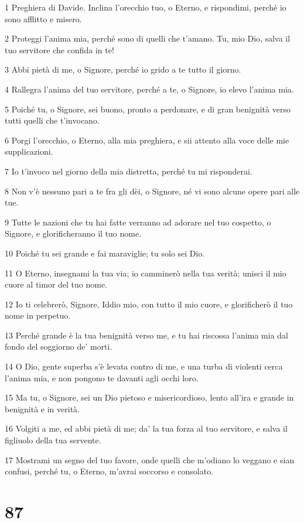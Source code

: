 \par 1 Preghiera di Davide. Inclina l'orecchio tuo, o Eterno, e rispondimi, perché io sono afflitto e misero.
\par 2 Proteggi l'anima mia, perché sono di quelli che t'amano. Tu, mio Dio, salva il tuo servitore che confida in te!
\par 3 Abbi pietà di me, o Signore, perché io grido a te tutto il giorno.
\par 4 Rallegra l'anima del tuo servitore, perché a te, o Signore, io elevo l'anima mia.
\par 5 Poiché tu, o Signore, sei buono, pronto a perdonare, e di gran benignità verso tutti quelli che t'invocano.
\par 6 Porgi l'orecchio, o Eterno, alla mia preghiera, e sii attento alla voce delle mie supplicazioni.
\par 7 Io t'invoco nel giorno della mia distretta, perché tu mi risponderai.
\par 8 Non v'è nessuno pari a te fra gli dèi, o Signore, né vi sono alcune opere pari alle tue.
\par 9 Tutte le nazioni che tu hai fatte verranno ad adorare nel tuo cospetto, o Signore, e glorificheranno il tuo nome.
\par 10 Poiché tu sei grande e fai maraviglie; tu solo sei Dio.
\par 11 O Eterno, insegnami la tua via; io camminerò nella tua verità; unisci il mio cuore al timor del tuo nome.
\par 12 Io ti celebrerò, Signore, Iddio mio, con tutto il mio cuore, e glorificherò il tuo nome in perpetuo.
\par 13 Perché grande è la tua benignità verso me, e tu hai riscossa l'anima mia dal fondo del soggiorno de' morti.
\par 14 O Dio, gente superba s'è levata contro di me, e una turba di violenti cerca l'anima mia, e non pongono te davanti agli occhi loro.
\par 15 Ma tu, o Signore, sei un Dio pietoso e misericordioso, lento all'ira e grande in benignità e in verità.
\par 16 Volgiti a me, ed abbi pietà di me; da' la tua forza al tuo servitore, e salva il figliuolo della tua servente.
\par 17 Mostrami un segno del tuo favore, onde quelli che m'odiano lo veggano e sian confusi, perché tu, o Eterno, m'avrai soccorso e consolato.

\chapter{87}

